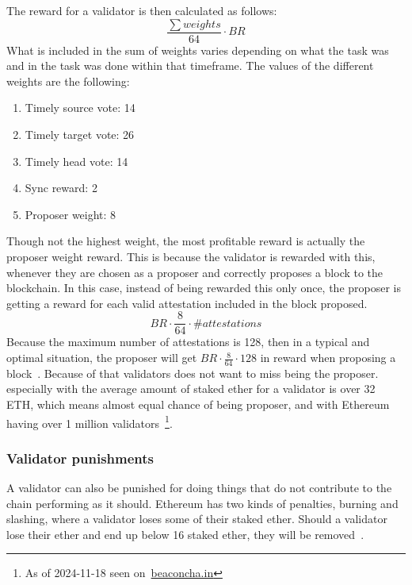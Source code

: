 The reward for a validator is then calculated as follows:
\begin{equation}
    \frac{\sum{weights}}{64}\cdot BR
    \label{eq:valrewards}
\end{equation}
What is included in the sum of weights varies depending on what the task was and in the task was done within that timeframe.
The values of the different weights are the following:
\begin{enumerate}
    \item Timely source vote: 14
    \item Timely target vote: 26
    \item Timely head vote: 14
    \item Sync reward: 2
    \item Proposer weight: 8
\end{enumerate}
Though not the highest weight, the most profitable reward is actually the proposer weight reward.
This is because the validator is rewarded with this, whenever they are chosen as a proposer and correctly proposes a block to the blockchain.
In this case, instead of being rewarded this only once,
the proposer is getting a reward for each valid attestation included in the block proposed.
\begin{equation}
    BR\cdot\frac{8}{64}\cdot \#attestations\label
    {eq:propreward}
\end{equation}
Because the maximum number of attestations is 128,
then in a typical and optimal situation,
the proposer will get $BR\cdot\frac{8}{64}\cdot128$ in reward
when proposing a block~\cite{PoSRewAndPen,consensus-spec-phase-0}.
Because of that validators does not want to miss being the proposer.
especially with the average amount of staked ether for a validator is over 32 ETH, which means almost equal chance of being proposer, and with Ethereum having over 1 million validators~\footnote{As of 2024-11-18 seen on~\href{https://beaconcha.in/}{beaconcha.in}}.

\subsubsection{Validator punishments}\label{subsubsec:valpunish}
A validator can also be punished for doing things that do not contribute to the chain performing as it should.
Ethereum has two kinds of penalties, burning and slashing, where a validator loses some of their staked ether\@.
Should a validator lose their ether and end up below 16 staked ether, they will be removed~\cite{consensus-spec-phase-0}.


